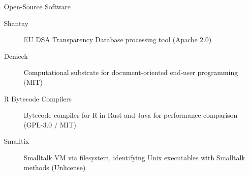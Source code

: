 \documentclass[aspectratio=169]{beamer}
\begin{document}
\begin{frame}{Open-Source Software}
  \begin{description}
    \item[Shantay] EU DSA Transparency Database processing tool (Apache 2.0)
    \item[Denicek] Computational substrate for document-oriented end-user programming (MIT)
    \item[R Bytecode Compilers] Bytecode compiler for R in Rust and Java for performance comparison (GPL-3.0 / MIT)
    \item[Smalltix] Smalltalk VM via filesystem, identifying Unix executables with Smalltalk methods (Unlicense)
  \end{description}
\end{frame}
\end{document}
